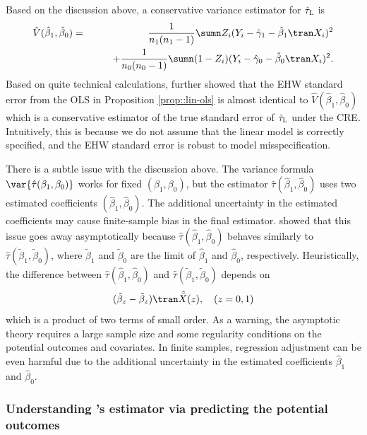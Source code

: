 Based on the discussion above, a conservative variance estimator for $\hat{\tau}_\textsc{L}$ is 
\begin{eqnarray*}
\hat{V}(  \hat{\beta}_1, \hat{\beta}_0 ) 
&=& \frac{1}{n_1(n_1 - 1)} \sumn Z_i  ( Y_i - \hat{\gamma}_1 - \hat{\beta}_1\tran  X_i  ) ^2 \\
&& \qquad + \frac{1}{n_0(n_0 - 1)} \sumn (1-Z_i)  ( Y_i - \hat{\gamma}_0 - \hat{\beta}_0\tran  X_i )^2.
\end{eqnarray*}
Based on quite technical calculations, \citet{lin2013} further showed that the EHW standard error from the OLS in Proposition \ref{prop::lin-ols} is almost identical to $\hat{V}(  \hat{\beta}_1, \hat{\beta}_0 ) $ which is a conservative estimator of the true standard error of $\hat{\tau}_\textsc{L}$ under the CRE. Intuitively, this is because we do not assume that the linear model is correctly specified, and the EHW standard error is robust to model misspecification. 



There is a subtle issue with the discussion above. The variance formula $\var\{ \hat{\tau}(\beta_1, \beta_0) \} $ works for fixed $(\beta_1, \beta_0)$, but the estimator $ \hat{\tau}( \hat{\beta}_1, \hat{\beta}_0) $ uses two estimated coefficients $( \hat{\beta}_1, \hat{\beta}_0) $. The additional uncertainty in the estimated coefficients may cause finite-sample bias in the final estimator. \citet{lin2013} showed that this issue goes away asymptotically because $ \hat{\tau}( \hat{\beta}_1, \hat{\beta}_0) $ behaves similarly to $ \hat{\tau}( \tilde{\beta}_1, \tilde{\beta}_0) $, where $\tilde{\beta}_1$ and $\tilde{\beta}_0$ are the limit of $\hat{\beta}_1$ and $ \hat{\beta}_0$, respectively. Heuristically, the difference between  $ \hat{\tau}( \hat{\beta}_1, \hat{\beta}_0) $ and $ \hat{\tau}( \tilde{\beta}_1, \tilde{\beta}_0) $ depends on 
$$
(\hat{\beta}_z - \tilde{\beta}_z)\tran \hat{\bar{X} }(z) ,\quad (z=0,1) 
$$
which is a product of two terms of small order. As a warning,  the asymptotic theory requires a large sample size and some regularity conditions on the potential outcomes and covariates. In finite samples, regression adjustment can be even harmful due to the additional uncertainty in the estimated coefficients $\hat{\beta}_1$ and $\hat{\beta}_0$. 




\subsubsection{Understanding \citet{lin2013}'s estimator via predicting the potential outcomes}
\label{sec::understand-lin-predict}
 
